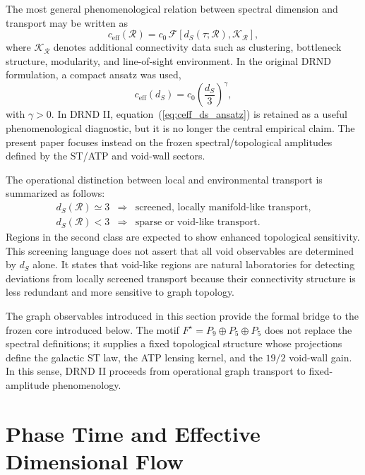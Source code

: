 \documentclass[12pt]{iopart}
\begin{document}
The most general phenomenological relation between spectral dimension and transport may be written as
\begin{equation}
c_{\mathrm{eff}}(\mathcal{R})
=
c_0\,\mathcal{F}\!\left[d_S(\tau;\mathcal{R}),\mathcal{K}_{\mathcal{R}}\right],
\end{equation}
where \(\mathcal{K}_{\mathcal{R}}\) denotes additional connectivity data such as clustering, bottleneck structure, modularity, and line-of-sight environment. In the original DRND formulation, a compact ansatz was used,
\begin{equation}
c_{\mathrm{eff}}(d_S)
=
c_0
\left(\frac{d_S}{3}\right)^\gamma,
\label{eq:ceff_ds_ansatz}
\end{equation}
with \(\gamma>0\). In DRND II, equation~(\ref{eq:ceff_ds_ansatz}) is retained as a useful phenomenological diagnostic, but it is no longer the central empirical claim. The present paper focuses instead on the frozen spectral/topological amplitudes defined by the ST/ATP and void-wall sectors.

The operational distinction between local and environmental transport is summarized as follows:
\begin{eqnarray}
d_S(\mathcal{R})\simeq 3
&\Rightarrow&
\textrm{screened, locally manifold-like transport},
\nonumber\\
d_S(\mathcal{R})<3
&\Rightarrow&
\textrm{sparse or void-like transport}.
\end{eqnarray}
Regions in the second class are expected to show enhanced topological sensitivity.
This screening language does not assert that all void observables are determined by \(d_S\) alone. It states that void-like regions are natural laboratories for detecting deviations from locally screened transport because their connectivity structure is less redundant and more sensitive to graph topology.

The graph observables introduced in this section provide the formal bridge to the frozen core introduced below. The motif \(F^\star=P_9\oplus P_5\oplus P_5\) does not replace the spectral definitions; it supplies a fixed topological structure whose projections define the galactic ST law, the ATP lensing kernel, and the \(19/2\) void-wall gain. In this sense, DRND II proceeds from operational graph transport to fixed-amplitude phenomenology.

\section{Phase Time and Effective Dimensional Flow}
\label{sec:phase_time}
\end{document}
